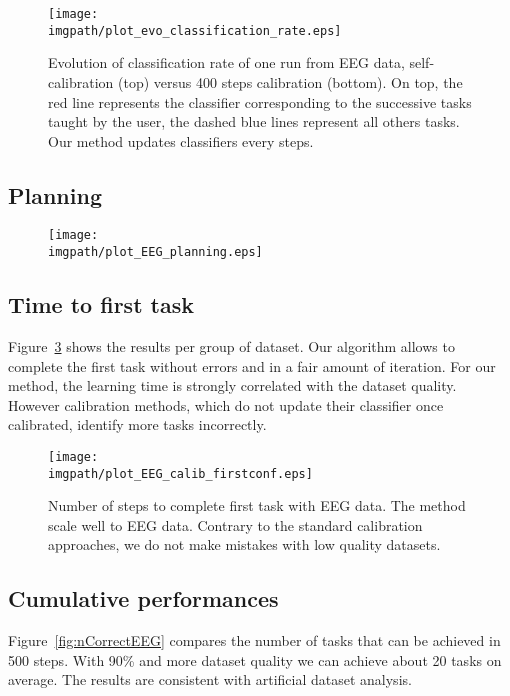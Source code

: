 \begin{figure}[!ht]
\centering
\texttt{[image: \\imgpath/plot\_evo\_classification\_rate.eps]}
\caption{Evolution of classification rate of one run from EEG data, self-calibration (top) versus 400 steps calibration (bottom). On top, the red line represents the classifier corresponding to the successive tasks taught by the user, the dashed blue lines represent all others tasks. Our method updates classifiers every steps.}
\label{fig:sequence_evolution}
\end{figure} 

\subsection{Planning}

\begin{figure}[!ht]
    \centering
    \texttt{[image: \\imgpath/plot\_EEG\_planning.eps]}
    \caption{}
    \label{fig:planningEEG}
\end{figure}



\subsection{Time to first task}

Figure~\ref{fig:firstEEG} shows the results per group of dataset. Our algorithm allows to complete the first task without errors and in a fair amount of iteration.  For our method, the learning time is strongly correlated with the dataset quality. However calibration methods, which do not update their classifier once calibrated, identify more tasks incorrectly.

\begin{figure}[!ht]
\centering
\texttt{[image: \\imgpath/plot\_EEG\_calib\_firstconf.eps]}
\caption{Number of steps to complete first task with EEG data. The method scale well to EEG data. Contrary to the standard calibration approaches, we do not make mistakes with low quality datasets.}
\label{fig:firstEEG}
\end{figure} 

\subsection{Cumulative performances}

Figure~\ref{fig:nCorrectEEG} compares the number of tasks that can be achieved in 500 steps. With 90\% and more dataset quality we can achieve about 20 tasks on average. The results are consistent with artificial dataset analysis.

